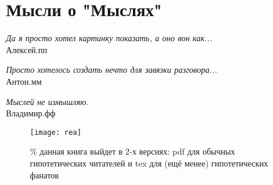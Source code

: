 \pagecolor{white}
\section*{Мысли о "Мыслях"}

\begin{flushright}
\emph{Да я просто хотел картинку показать, а оно вон как...}\\
    Алексей.пп %
\end{flushright}
\vspace{1cm}
\begin{flushright}
\emph{Просто хотелось создать нечто для завязки разговора...}\\
Антон.мм %
\end{flushright}
\vspace{1cm}
\begin{flushright}
\emph{Мыслей не измышляю.}\\
Владимир.фф %
\end{flushright}
\vspace{1.5cm}
\begin{figure}[ht!]
    \centering
    \texttt{[image: rea]}
    \caption{\% данная книга выйдет в 2-х версиях: pdf для обычных гипотетических читателей и tex для (ещё менее) гипотетических фанатов}
\end{figure}
